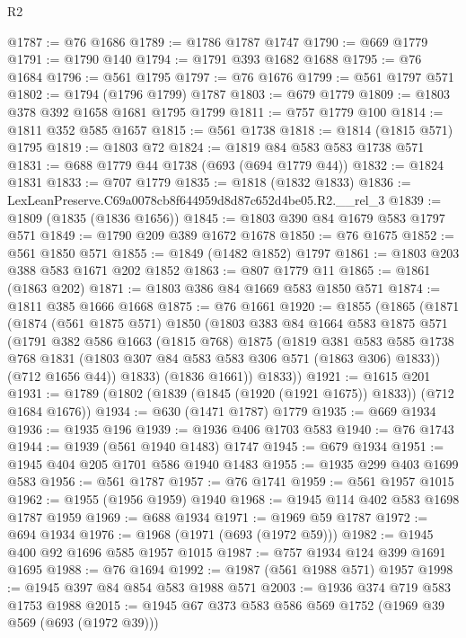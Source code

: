 \begin{lexlean}{R2}
\begin{coremodule}
@1787 := @76 @1686
@1789 := @1786 @1787 @1747
@1790 := @669 @1779
@1791 := @1790 @140
@1794 := @1791 @393 @1682 @1688
@1795 := @76 @1684
@1796 := @561 @1795
@1797 := @76 @1676
@1799 := @561 @1797 @571
@1802 := @1794 (@1796 @1799) @1787
@1803 := @679 @1779
@1809 := @1803 @378 @392 @1658 @1681 @1795 @1799
@1811 := @757 @1779 @100
@1814 := @1811 @352 @585 @1657
@1815 := @561 @1738
@1818 := @1814 (@1815 @571) @1795
@1819 := @1803 @72
@1824 := @1819 @84 @583 @583 @1738 @571
@1831 := @688 @1779 @44 @1738 (@693 (@694 @1779 @44))
@1832 := @1824 @1831
@1833 := @707 @1779
@1835 := @1818 (@1832 @1833)
@1836 := LexLeanPreserve.C69a0078cb8f644959d8d87c652d4be05.R2.__rel_3
@1839 := @1809 (@1835 (@1836 @1656))
@1845 := @1803 @390 @84 @1679 @583 @1797 @571
@1849 := @1790 @209 @389 @1672 @1678
@1850 := @76 @1675
@1852 := @561 @1850 @571
@1855 := @1849 (@1482 @1852) @1797
@1861 := @1803 @203 @388 @583 @1671 @202 @1852
@1863 := @807 @1779 @11
@1865 := @1861 (@1863 @202)
@1871 := @1803 @386 @84 @1669 @583 @1850 @571
@1874 := @1811 @385 @1666 @1668
@1875 := @76 @1661
@1920 := @1855
    (@1865
      (@1871
        (@1874
          (@561 @1875 @571)
          @1850
          (@1803
            @383
            @84
            @1664
            @583
            @1875
            @571
            (@1791
              @382
              @586
              @1663
              (@1815 @768)
              @1875
              (@1819
                @381
                @583
                @585
                @1738
                @768
                @1831
                (@1803 @307 @84 @583 @583 @306 @571 (@1863 @306) @1833))
              (@712 @1656 @44))
            @1833)
          (@1836 @1661))
        @1833))
@1921 := @1615 @201
@1931 := @1789 (@1802 (@1839 (@1845 (@1920 (@1921 @1675)) @1833)) (@712 @1684 @1676))
@1934 := @630 (@1471 @1787) @1779
@1935 := @669 @1934
@1936 := @1935 @196
@1939 := @1936 @406 @1703 @583
@1940 := @76 @1743
@1944 := @1939 (@561 @1940 @1483) @1747
@1945 := @679 @1934
@1951 := @1945 @404 @205 @1701 @586 @1940 @1483
@1955 := @1935 @299 @403 @1699 @583
@1956 := @561 @1787
@1957 := @76 @1741
@1959 := @561 @1957 @1015
@1962 := @1955 (@1956 @1959) @1940
@1968 := @1945 @114 @402 @583 @1698 @1787 @1959
@1969 := @688 @1934
@1971 := @1969 @59 @1787
@1972 := @694 @1934
@1976 := @1968 (@1971 (@693 (@1972 @59)))
@1982 := @1945 @400 @92 @1696 @585 @1957 @1015
@1987 := @757 @1934 @124 @399 @1691 @1695
@1988 := @76 @1694
@1992 := @1987 (@561 @1988 @571) @1957
@1998 := @1945 @397 @84 @854 @583 @1988 @571
@2003 := @1936 @374 @719 @583 @1753 @1988
@2015 := @1945 @67 @373 @583 @586 @569 @1752 (@1969 @39 @569 (@693 (@1972 @39)))

\end{coremodule}
\end{lexlean}
